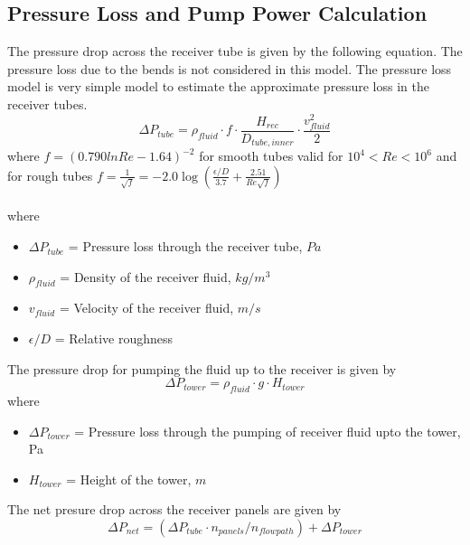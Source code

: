 \subsection{Pressure Loss and Pump Power Calculation}
The pressure drop across the receiver tube is given by the following equation. The pressure loss due to the bends is not considered in this model. The pressure loss model is very simple model to estimate the approximate pressure loss in the receiver tubes.
\begin{equation}
\Delta P_{tube}=\rho_{fluid} \cdot f\cdot \frac{H_{rec}}{D_{tube,inner}} \cdot \frac{v_{fluid}^2}{2}
\end{equation}
where $f = (0.790lnRe-1.64)^{-2}$ for smooth tubes valid for $10^4<Re<10^6 $ and for rough tubes $f = \frac{1}{\sqrt{f}}=-2.0\log{\left(\frac{\epsilon/D}{3.7}+\frac{2.51}{Re\sqrt{f}}\right)}$ \\\\
where 
\begin{itemize}
	\item $\Delta P_{tube}$ = Pressure loss through the receiver tube, $Pa$
	\item $\rho_{fluid}$ = Density of the receiver fluid, $kg/m^3$
	\item $v_{fluid}$ = Velocity of the receiver fluid, $m/s$
	\item $\epsilon/D $ = Relative roughness
\end{itemize}
The pressure drop for pumping the fluid up to the receiver is given by
\begin{equation}
\Delta P_{tower}=\rho_{fluid}\cdot g \cdot H_{tower}
\end{equation}
where 
\begin{itemize}
	\item $\Delta P_{tower}$ = Pressure loss through the pumping of receiver fluid upto the tower, Pa
	\item $H_{tower}$ = Height of the tower, $m$
\end{itemize}
The net presure drop across the receiver panels are given by 
\begin{equation}
\Delta P_{net}=(\Delta P_{tube}\cdot  n_{panels}/n_{flow path})+\Delta P_{tower}
\end{equation}
